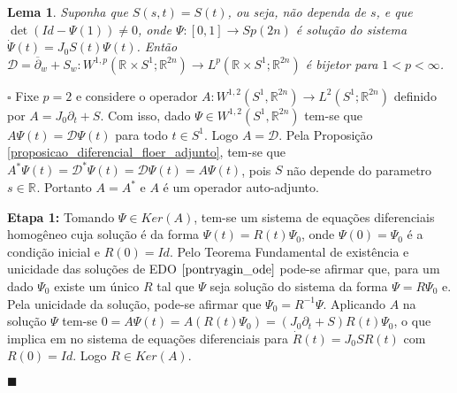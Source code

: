 \documentclass[12pt]{book}
\newtheorem{lema}[teorema]{Lema}
\newenvironment{prova}[1]{$\square$ #1}{\hfill$\blacksquare$}
\newcommand{\circulo}{S^{1}}
\newcommand{\diferencialfloerabrev}{\mathcal{D}}
\newcommand{\derivadaparcialabrev}[1]{\partial_{#1}}
\newcommand{\espacoLdois}[1]{L^{2}(#1)}
\newcommand{\espacoLpcontradominio}[2]{L^{p}(#1;#2)}
\newcommand{\espacoLpretacirculo}{\espacoLpcontradominio{\retacartesianocirculo}{\real{2n}}}
\newcommand{\espacosobolevcontradominio}[2]{W^{1,p}(#1;#2)}
\newcommand{\espacosobolevretacirculo}{\espacosobolevcontradominio{\retacartesianocirculo}{\real{2n}}}
\newcommand{\espacosobolevdois}[2]{\espacosobolevgeral{2}{#1, #2}}
\newcommand{\espacosobolevgeral}[2]{W^{1,#1}(#2)}
\newcommand{\estruturacomplexa}{J_{0}}
\newcommand{\gruposimpletico}[1]{Sp(#1)}
\newcommand{\operadorcauchyabrev}[1]{\overline{\partial}_{#1}}
\newcommand{\retacartesianocirculo}{\real{} \times \circulo}
\newcommand{\real}[1]{\mathbb{R}^{#1}}
\begin{document}
	\begin{lema}\label{lema_diferencial_floer_bijecao}
		Suponha que $S(s,t) = S(t)$, ou seja, não dependa de $s$, e que $\det(Id - \Psi(1)) \neq 0 $, onde $\Psi:[0,1] \to \gruposimpletico{2n}$ é solução do sistema $\dot{\Psi}(t)=\estruturacomplexa S(t)\Psi(t)$. Então $\diferencialfloerabrev = \operadorcauchyabrev{w} + S_{w}: \espacosobolevretacirculo \to \espacoLpretacirculo$ é bijetor para $1<p<\infty$.
	\end{lema}
	\begin{prova}
		Fixe $p=2$ e considere o operador $A: \espacosobolevdois{\circulo}{\real{2n}} \to \espacoLdois{\circulo;\real{2n}}$ definido por $A = \estruturacomplexa \derivadaparcialabrev{t} + S$. Com isso, dado $\Psi \in \espacosobolevdois{\circulo}{\real{2n}}$ tem-se que $A\Psi(t) = \diferencialfloerabrev\Psi(t)$ para todo $t \in \circulo$. Logo $A=\diferencialfloerabrev$. Pela Proposição \ref{proposicao_diferencial_floer_adjunto}, tem-se que $A^{*}\Psi(t) = \diferencialfloerabrev^{*}\Psi(t) = \diferencialfloerabrev\Psi(t) = A\Psi(t)$, pois $S$ não depende do parametro $s \in \real{}$. Portanto $A=A^{*}$ e $A$ é um operador auto-adjunto.
		
		\textbf{Etapa 1:} Tomando $\Psi \in Ker(A)$, tem-se um sistema de equações diferenciais homogêneo cuja solução é da forma $\Psi(t) = R(t)\Psi_{0}$, onde $\Psi(0)=\Psi_{0}$ é a condição inicial e $R(0) = Id$. Pelo Teorema Fundamental de existência e unicidade das soluções de EDO $\cite{pontryagin_ode}$ pode-se afirmar que, para um dado $\Psi_{0}$ existe um único $R$ tal que $\Psi$ seja solução do sistema da forma $\Psi = R\Psi_{0}$ e. Pela unicidade da solução, pode-se afirmar que $\Psi_{0}=R^{-1}\Psi$. Aplicando $A$ na solução $\Psi$ tem-se
		$0=A\Psi(t) = A(R(t)\Psi_{0}) = (\estruturacomplexa\derivadaparcialabrev{t}+S)R(t)\Psi_{0}$, o que implica em no sistema de equações diferenciais para $\dot{R}(t) = \estruturacomplexa SR(t)$ com $R(0) = Id$. Logo $R \in Ker(A)$.
		

\end{prova}
\end{document}
